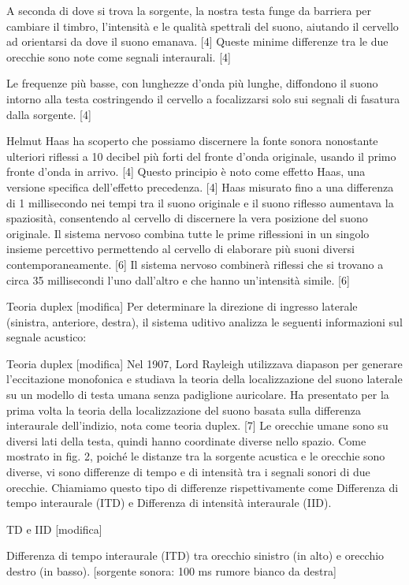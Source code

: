 A seconda di dove si trova la sorgente, la nostra testa funge da barriera per cambiare il timbro, l'intensità e le qualità spettrali del suono, aiutando il cervello ad orientarsi da dove il suono emanava. [4] Queste minime differenze tra le due orecchie sono note come segnali interaurali. [4]

Le frequenze più basse, con lunghezze d'onda più lunghe, diffondono il suono intorno alla testa costringendo il cervello a focalizzarsi solo sui segnali di fasatura dalla sorgente. [4]

Helmut Haas ha scoperto che possiamo discernere la fonte sonora nonostante ulteriori riflessi a 10 decibel più forti del fronte d'onda originale, usando il primo fronte d'onda in arrivo. [4] Questo principio è noto come effetto Haas, una versione specifica dell'effetto precedenza. [4] Haas misurato fino a una differenza di 1 millisecondo nei tempi tra il suono originale e il suono riflesso aumentava la spaziosità, consentendo al cervello di discernere la vera posizione del suono originale. Il sistema nervoso combina tutte le prime riflessioni in un singolo insieme percettivo permettendo al cervello di elaborare più suoni diversi contemporaneamente. [6] Il sistema nervoso combinerà riflessi che si trovano a circa 35 millisecondi l'uno dall'altro e che hanno un'intensità simile. [6]

Teoria duplex [modifica]
Per determinare la direzione di ingresso laterale (sinistra, anteriore, destra), il sistema uditivo analizza le seguenti informazioni sul segnale acustico:

Teoria duplex [modifica]
Nel 1907, Lord Rayleigh utilizzava diapason per generare l'eccitazione monofonica e studiava la teoria della localizzazione del suono laterale su un modello di testa umana senza padiglione auricolare. Ha presentato per la prima volta la teoria della localizzazione del suono basata sulla differenza interaurale dell'indizio, nota come teoria duplex. [7] Le orecchie umane sono su diversi lati della testa, quindi hanno coordinate diverse nello spazio. Come mostrato in fig. 2, poiché le distanze tra la sorgente acustica e le orecchie sono diverse, vi sono differenze di tempo e di intensità tra i segnali sonori di due orecchie. Chiamiamo questo tipo di differenze rispettivamente come Differenza di tempo interaurale (ITD) e Differenza di intensità interaurale (IID).

TD e IID [modifica]

Differenza di tempo interaurale (ITD) tra orecchio sinistro (in alto) e orecchio destro (in basso).
[sorgente sonora: 100 ms rumore bianco da destra]

